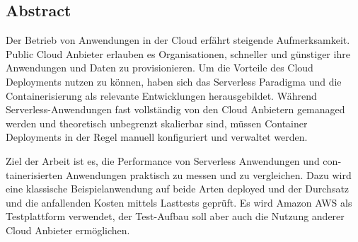 

\begin{otherlanguage}{american}
\chapter*{Abstract}
Der Betrieb von Anwendungen in der Cloud erfährt steigende Aufmerksamkeit. Public Cloud Anbieter erlauben es Organisationen, schneller und günstiger ihre Anwendungen und Daten zu provisionieren. Um die Vorteile des Cloud Deployments nutzen zu können, haben sich das Serverless Paradigma und die Containerisierung als relevante Entwicklungen herausgebildet. Während Serverless-Anwendungen fast vollständig von den Cloud Anbietern gemanaged werden und theoretisch unbegrenzt skalierbar sind, müssen Container Deployments in der Regel manuell konfiguriert und verwaltet werden. 

Ziel der Arbeit ist es, die Performance von Serverless Anwendungen und containerisierten Anwendungen praktisch zu messen und zu vergleichen. Dazu wird eine klassische Beispielanwendung auf beide Arten deployed und der Durchsatz und die anfallenden Kosten mittels Lasttests geprüft.
Es wird Amazon AWS als Testplattform verwendet, der Test-Aufbau soll aber auch die Nutzung anderer Cloud Anbieter ermöglichen.
\end{otherlanguage}